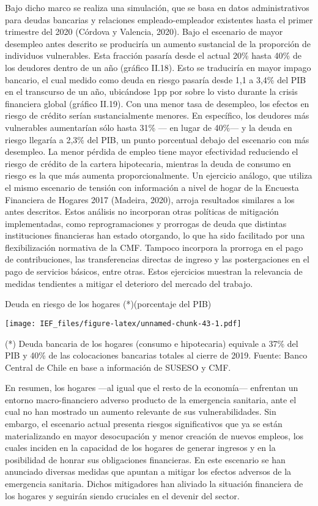 \documentclass[
]{book}
\begin{document}
Bajo dicho marco se realiza una simulación, que se basa en datos administrativos
para deudas bancarias y relaciones empleado-empleador existentes hasta el
primer trimestre del 2020 (Córdova y Valencia, 2020). Bajo el escenario de
mayor desempleo antes descrito se produciría un aumento sustancial de la
proporción de individuos vulnerables. Esta fracción pasaría desde el actual 20\%
hasta 40\% de los deudores dentro de un año (gráfico II.18). Esto se traduciría en mayor impago bancario, el cual medido como deuda en riesgo pasaría desde
1,1 a 3,4\% del PIB en el transcurso de un año, ubicándose 1pp por sobre lo
visto durante la crisis financiera global (gráfico II.19). Con una menor tasa de
desempleo, los efectos en riesgo de crédito serían sustancialmente menores.
En específico, los deudores más vulnerables aumentarían sólo hasta 31\% ---
en lugar de 40\%--- y la deuda en riesgo llegaría a 2,3\% del PIB, un punto
porcentual debajo del escenario con más desempleo. La menor pérdida de
empleo tiene mayor efectividad reduciendo el riesgo de crédito de la cartera
hipotecaria, mientras la deuda de consumo en riesgo es la que más aumenta
proporcionalmente. Un ejercicio análogo, que utiliza el mismo escenario de
tensión con información a nivel de hogar de la Encuesta Financiera de Hogares
2017 (Madeira, 2020), arroja resultados similares a los antes descritos. Estos
análisis no incorporan otras políticas de mitigación implementadas, como
reprogramaciones y prorrogas de deuda que distintas instituciones financieras
han estado otorgando, lo que ha sido facilitado por una flexibilización normativa
de la CMF. Tampoco incorpora la prorroga en el pago de contribuciones, las
transferencias directas de ingreso y las postergaciones en el pago de servicios
básicos, entre otras. Estos ejercicios muestran la relevancia de medidas
tendientes a mitigar el deterioro del mercado del trabajo.

Deuda en riesgo de los hogares (*)(porcentaje del PIB)

\texttt{[image: IEF\_files/figure-latex/unnamed-chunk-43-1.pdf]}

(*) Deuda bancaria de los hogares (consumo e hipotecaria) equivale a 37\% del PIB y 40\% de las colocaciones bancarias totales al cierre de 2019.
Fuente: Banco Central de Chile en base a información de SUSESO y CMF.

En resumen, los hogares ---al igual que el resto de la economía--- enfrentan
un entorno macro-financiero adverso producto de la emergencia sanitaria, ante
el cual no han mostrado un aumento relevante de sus vulnerabilidades. Sin
embargo, el escenario actual presenta riesgos significativos que ya se están
materializando en mayor desocupación y menor creación de nuevos empleos,
los cuales inciden en la capacidad de los hogares de generar ingresos y en la
posibilidad de honrar sus obligaciones financieras. En este escenario se han
anunciado diversas medidas que apuntan a mitigar los efectos adversos de la
emergencia sanitaria. Dichos mitigadores han aliviado la situación financiera de
los hogares y seguirán siendo cruciales en el devenir del sector.
\end{document}
